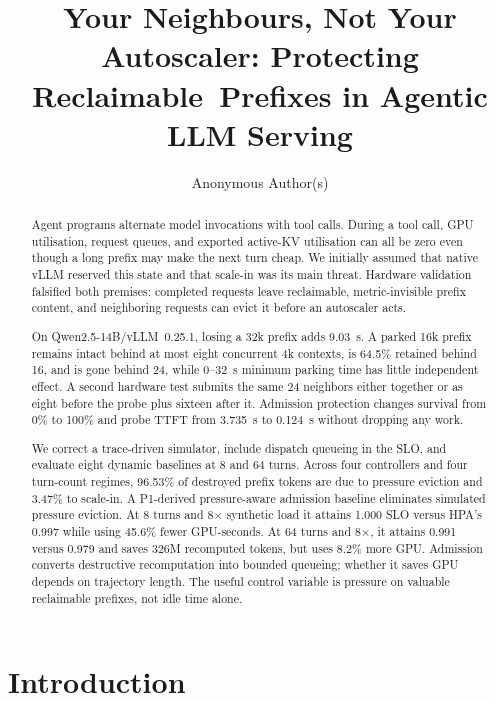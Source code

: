 \documentclass[sigconf,nonacm]{acmart}
\begin{document}
\title{Your Neighbours, Not Your Autoscaler: Protecting Reclaimable\
Prefixes in Agentic LLM Serving}
\author{Anonymous Author(s)}

\begin{abstract}
Agent programs alternate model invocations with tool calls. During a tool
call, GPU utilisation, request queues, and exported active-KV utilisation can
all be zero even though a long prefix may make the next turn cheap. We
initially assumed that native vLLM reserved this state and that scale-in was
its main threat. Hardware validation falsified both premises: completed
requests leave reclaimable, metric-invisible prefix content, and neighboring
requests can evict it before an autoscaler acts.

On Qwen2.5-14B/vLLM~0.25.1, losing a 32k prefix adds 9.03~s. A parked 16k
prefix remains intact behind at most eight concurrent 4k contexts, is 64.5\%
retained behind 16, and is gone behind 24, while 0--32~s minimum parking time
has little independent effect. A second hardware test submits the same 24
neighbors either together or as eight before the probe plus sixteen after it.
Admission protection changes survival from 0\% to 100\% and probe TTFT from
3.735~s to 0.124~s without dropping any work.

We correct a trace-driven simulator, include dispatch queueing in the SLO, and
evaluate eight dynamic baselines at 8 and 64 turns. Across four controllers
and four turn-count regimes, 96.53\% of destroyed prefix tokens are due to
pressure eviction and 3.47\% to scale-in. A P1-derived pressure-aware admission
baseline eliminates simulated pressure eviction. At 8 turns and 8$\times$
synthetic load it attains 1.000 SLO versus HPA's 0.997 while using 45.6\% fewer
GPU-seconds. At 64 turns and 8$\times$, it attains 0.991 versus 0.979 and saves
326M recomputed tokens, but uses 8.2\% more GPU. Admission converts destructive
recomputation into bounded queueing; whether it saves GPU depends on trajectory
length. The useful control variable is pressure on valuable reclaimable
prefixes, not idle time alone.
\end{abstract}

\maketitle

\section{Introduction}
\end{document}

